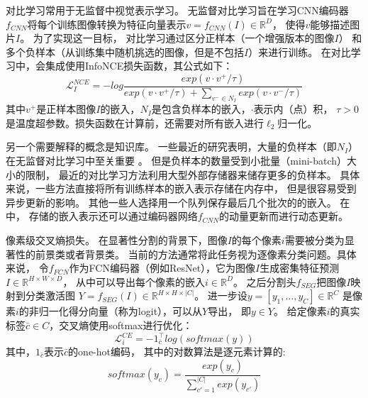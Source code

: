 \label{chap:part4_cons}
% 
% 
% 
% 
对比学习常用于无监督中视觉表示学习。
无监督对比学习旨在学习CNN编码器$f_{CNN}$将每个训练图像转换为特征向量表示$v=f_{CNN}(I) \in \mathbb{R}^{D}$，
使得$v$能够描述图片$I$。
为了实现这一目标，
对比学习通过区分正样本（一个增强版本的图像$I$）
和多个负样本（从训练集中随机挑选的图像，但是不包括$I$）来进行训练。
在对比学习中，会集成使用InfoNCE损失函数，其公式如下：
\begin{equation}
	\mathcal{L} _{I}^{NCE}=-log \frac{exp(v \cdot v^{+ }/\tau )}
{exp(v \cdot v^{+}/\tau )+ \sum_{v^{-}\in N_{I}} exp(v \cdot v^{-}/\tau )} 
\end{equation}
其中$v^{+}$是正样本图像$I$的嵌入，$N_{I}$是包含负样本的嵌入，$\cdot$表示内（点）积，
$\tau >0$是温度超参数。损失函数在计算前，还需要对所有嵌入进行$\ell_{2}$归一化。
\par
% 
% 
% 
% 
另一个需要解释的概念是知识库。
一些最近的研究表明，大量的负样本（即$N_{I}$）在无监督对比学习中至关重要
\cite{wu2018unsupervised,chen2020improved,he2020momentum}。
但是负样本的数量受到小批量（mini-batch）大小的限制，
最近的对比学习方法利用大型外部存储器来储存更多的负样本。
具体来说，一些方法\cite{wu2018unsupervised}直接将所有训练样本的嵌入表示存储在内存中，
但是很容易受到异步更新的影响。
其他一些人选择用一个队列保存最后几个批次的的嵌入\cite{wang2020cross,chen2020improved,he2020momentum}。
在\cite{chen2020improved,he2020momentum}中，
存储的嵌入表示还可以通过编码器网络$f_{CNN}$的动量更新而进行动态更新。
\par
% 
% 
% 
% 
像素级交叉熵损失。
在显著性分割的背景下，图像$I$的每个像素$i$需要被分类为显著性的前景类或者背景类。
当前的方法通常将此任务视为逐像素分类问题。具体来说，
令$f_{FCN}$作为FCN编码器（例如ResNet\cite{he2016deep}），它为图像$I$生成密集特征预测
$I\in \mathbb{R}^{ H \times W \times D}$，
从中可以导出每个像素的嵌入$i \in  \mathbb{R}^{D}$。
之后分割头$f_{SEG}$把图像$I$映射到分类激活图
$Y=f_{SEG}(I) \in \mathbb{R}^{H\times H \times |C|}$。
进一步设$y=\left [ y_{1},\dots, y_{C} \right ] \in\mathbb{R}^{C}$
是像素$i$的非归一化得分向量（称为logit），可以从$Y$导出，
即$y \in Y$。
给定像素$i$的真实标签$\bar{c} \in C$，交叉熵使用softmax进行优化：
\begin{equation}
	\mathcal{L}_{i}^{CE}=-1_{\bar{c}}^{\top } log(softmax(y))
	\label{chpt4:eq:loss_softmax}
\end{equation}
% 
% 
% 
% 
其中，$1_{\bar{c}}$表示$\bar{c}$的one-hot编码，
其中的对数算法是逐元素计算的:
\begin{equation}
softmax(y_{c}) = \frac
{exp(y_{c})}
{ 
\sum_{{c}'=1 }^{|C|} 
exp(y_{{c}'}) 
} 
\end{equation}
